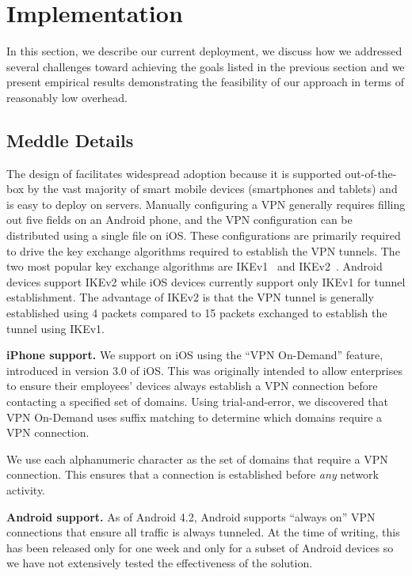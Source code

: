 \section{Implementation}
\label{sec:deploy}
In this section, we describe our current deployment, we discuss how we addressed several 
challenges toward achieving the goals listed in the previous section and 
we present empirical results demonstrating the feasibility of our approach 
in terms of reasonably low overhead. 

\subsection{Meddle Details}
The design of \meddle facilitates widespread adoption because it is supported out-of-the-box by the vast majority of smart mobile devices (smartphones and tablets) and is easy to deploy on servers. Manually configuring a VPN generally requires filling out five fields on an Android phone, and the VPN configuration can be distributed using a single file on iOS. These configurations are primarily required to drive the key exchange algorithms required to establish the VPN tunnels. The two most popular key exchange algorithms are IKEv1~\cite{rfc4109} and IKEv2~\cite{rfc5996}. Android devices support IKEv2 while iOS devices currently support only IKEv1 for tunnel establishment. The advantage of IKEv2 is that the VPN tunnel is generally established using 4 packets compared to 15 packets exchanged to establish the tunnel using IKEv1.

\noindent\textbf{iPhone support.} We support \meddle on iOS using the ``VPN On-Demand'' feature, 
introduced in version 3.0 of iOS. This was originally intended to allow enterprises to 
ensure their employees' devices always establish a VPN connection before contacting 
a specified set of domains. Using trial-and-error, we discovered that VPN On-Demand uses 
suffix matching to determine which domains require a VPN connection. 

We use each alphanumeric character as the set of domains that require a VPN 
connection. This ensures that a connection is established before \emph{any} network 
activity.

\noindent\textbf{Android support.} As of Android 4.2, Android supports 
``always on'' VPN connections that ensure all traffic is always tunneled. 
At the time of writing, this has been released only for one week and only 
for a subset of Android devices so we have not extensively tested the 
effectiveness of the solution. 

